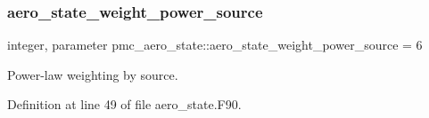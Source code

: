 \subsubsection{\texorpdfstring{aero\+\_\+state\+\_\+weight\+\_\+power\+\_\+source}{aero\_state\_weight\_power\_source}}
{\footnotesize\ttfamily integer, parameter pmc\+\_\+aero\+\_\+state\+::aero\+\_\+state\+\_\+weight\+\_\+power\+\_\+source = 6}



Power-\/law weighting by source. 



Definition at line 49 of file aero\+\_\+state.\+F90.

